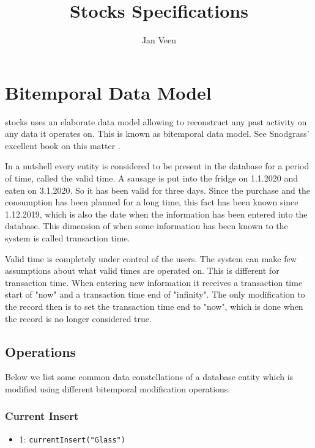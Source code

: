 \documentclass[a4paper]{memoir}
\title{Stocks Specifications}
\author{Jan Veen}
\begin{document}
\maketitle
\frontmatter

\tableofcontents
\listoffigures
\listoftables
\mainmatter

\chapter{Bitemporal Data Model}

stocks \cite{stocks} uses an elaborate data model allowing to reconstruct any
past activity on any data it operates on. This is known as bitemporal data
model. See Snodgrass' excellent book on this matter \cite{snodgrass}.

In a nutshell every entity is considered to be present in the database for a
period of time, called the valid time. A sausage is put into the fridge on
1.1.2020 and eaten on 3.1.2020. So it has been valid for three days. Since the
purchase and the consumption has been planned for a long time, this fact has
been known since 1.12.2019, which is also the date when the information has been
entered into the database. This dimension of when some information has been
known to the system is called transaction time.

Valid time is completely under control of the users. The system can make few
assumptions about what valid times are operated on. This is different for
transaction time. When entering new information it receives a transaction time
start of "now" and a transaction time end of "infinity". The only modification
to the record then is to set the transaction time end to "now", which is done
when the record is no longer considered true.

\section{Operations}

Below we list some common data constellations of a database entity which is
modified using different bitemporal modification operations.

\subsection{Current Insert}

\begin{itemize}
\item 1: \texttt{currentInsert("Glass")}
\end{itemize}
\end{document}
